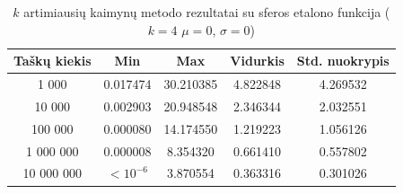\begin{table}[H]
    \centering
    \begin{tabular}{|c|c|c|c|c|}
        \hline
        \textbf{Taškų kiekis} & \textbf{Min} & \textbf{Max} & \textbf{Vidurkis} & \textbf{Std. nuokrypis} \\ \hline
        1 000        & 0.017474 & 30.210385 & 4.822848 & 4.269532 \\ \hline
        10 000       & 0.002903 & 20.948548 & 2.346344 & 2.032551 \\ \hline
        100 000      & 0.000080 & 14.174550 & 1.219223 & 1.056126 \\ \hline
        1 000 000    & 0.000008 & 8.354320 & 0.661410 & 0.557802 \\ \hline
        10 000 000   & $<10^{-6}$ & 3.870554 & 0.363316 & 0.301026 \\ \hline
    \end{tabular}
    \caption{$k$ artimiausių kaimynų metodo rezultatai su sferos etalono funkcija ($k = 4$ $\mu = 0$, $\sigma = 0$)}
\end{table}